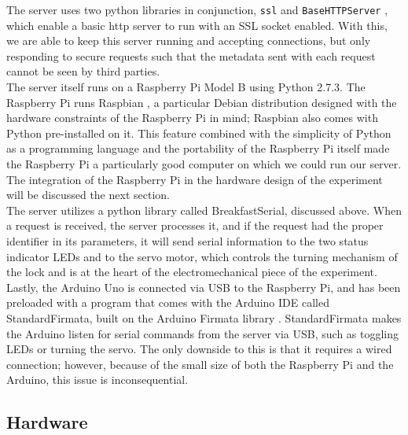 \documentclass[10pt]{article}
\begin{document}
\begin{multicols}{2}
The server uses two python libraries in conjunction, \texttt{ssl} \cite{pyssl} and \texttt{BaseHTTPServer} \cite{BaseHTTPServer}, which enable a basic http server to run with an SSL socket enabled. With this, we are able to keep this server running and accepting connections, but only responding to secure requests such that the metadata sent with each request cannot be seen by third parties. \\

The server itself runs on a Raspberry Pi Model B using Python 2.7.3. The Raspberry Pi runs Raspbian \cite{raspbian}, a particular Debian distribution designed with the hardware constraints of the Raspberry Pi in mind; Raspbian also comes with Python pre-installed on it. This feature combined with the simplicity of Python as a programming language and the portability of the Raspberry Pi itself made the Raspberry Pi a particularly good computer on which we could run our server. The integration of the Raspberry Pi in the hardware design of the experiment will be discussed the next section. \\

The server utilizes a python library called BreakfastSerial, discussed above. When a request is received, the server processes it, and if the request had the proper identifier in its parameters, it will send serial information to the two status indicator LEDs and to the servo motor, which controls the turning mechanism of the lock and is at the heart of the electromechanical piece of the experiment. \\

Lastly, the Arduino Uno is connected via USB to the Raspberry Pi, and has been preloaded with a program that comes with the Arduino IDE called StandardFirmata, built on the Arduino Firmata library \cite{arduinofirmata}. StandardFirmata makes the Arduino listen for serial commands from the server via USB, such as toggling LEDs or turning the servo. The only downside to this is that it requires a wired connection; however, because of the small size of both the Raspberry Pi and the Arduino, this issue is inconsequential. \\

\subsection{Hardware}


\end{multicols}
\end{document}
